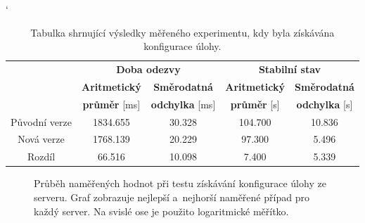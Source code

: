            \begin{table}[ht]
             \catcode`
             \begin{adjustwidth}{-0.5cm}{}
             \begin{center}
              \begin{tabular}{| c || c | c || c | c |} \hline
                \multirow{3}{*}{}  &   \multicolumn{2}{c||}{\textbf{Doba odezvy}}  &  \multicolumn{2}{c|}{\textbf{Stabilní stav}}\\ \cline{2-5}
                 & \textbf{Aritmetický}  &  \textbf{Směrodatná}  &  \textbf{Aritmetický} &  \textbf{Směrodatná}\\ 
                 & \textbf{průměr} [ms]  &  \textbf{odchylka} [ms]  &  \textbf{průměr} [s]  &  \textbf{odchylka} [s]\\ \hline
                Původní verze &  1834.655 &  30.328 &  104.700 & 10.836 \\\hline
                Nová verze &  1768.139 &  20.229 &  97.300 &  5.496\\\hline
                Rozdíl &  66.516 &  10.098 &  7.400 &  5.339\\\hline  
              \end{tabular}
              \caption{Tabulka shrnující výsledky měřeného experimentu, kdy byla získávána konfigurace úlohy.}
              \label{tabGetFreestyleFinal}
             \end{center}
             \end{adjustwidth}
            \end{table}

            \begin{figure}[h!t]
             \begin{adjustwidth}{-0.5cm}{}
                \begin{center}
                    \caption{Průběh naměřených hodnot při testu získávání konfigurace úlohy ze serveru.
                        Graf zobrazuje nejlepší a~nejhorší naměřené případ pro každý server.  
                        Na svislé ose je použito logaritmické měřítko.}
                    \label{imgGetFreestyleCely}
                \end{center}
             \end{adjustwidth}
            \end{figure}

